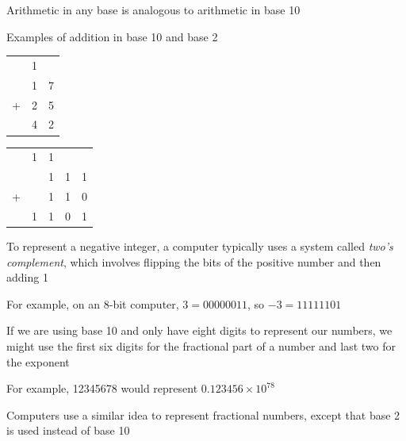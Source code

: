 \documentclass[8pt,a4paper,compress]{beamer}
\begin{document}
\begin{frame}[fragile]
Arithmetic in any base is analogous to arithmetic in base 10

\bigskip

Examples of addition in base 10 and base 2
\begin{center}

\begin{tabular}{ccc}
  & 1 &   \\ 
  & 1 & 7 \\
+ & 2 & 5 \\
\hline
  & 4 & 2 \\
\end{tabular}\hspace{2cm} \begin{tabular}{ccccc}
  & 1 & 1 &   \\ 
  &   & 1 & 1 & 1 \\
+ &   & 1 & 1 & 0 \\
\hline
  & 1 & 1 & 0 & 1 \\
\end{tabular}
\end{center}

\bigskip

To represent a negative integer, a computer typically uses a system called \emph{two's complement}, which involves flipping the bits of the positive number and then adding 1

\bigskip

For example, on an 8-bit computer, $3 = 00000011$, so $-3 = 11111101$
\end{frame}

\begin{frame}[fragile]
If we are using base 10 and only have eight digits to represent our numbers, we might use the first six digits for the fractional part of a number and last two for the exponent  

\bigskip

For example, 12345678 would represent $0.123456 \times 10^{78}$

\bigskip

Computers use a similar idea to represent fractional numbers, except that base 2 is used instead of base 10
\end{frame}
\end{document}
